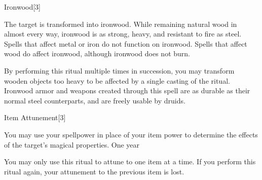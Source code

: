 \begin{spellsection}{Ironwood}[3]
    \begin{spellheader}
    \end{spellheader}
    \begin{spellcontent}
        \begin{spelltargetinginfo}
        \end{spelltargetinginfo}
        \begin{spelleffects}

            \spelleffect The target is transformed into ironwood. While remaining natural wood in almost every way, ironwood is as strong, heavy, and resistant to fire as steel. Spells that affect metal or iron do not function on ironwood. Spells that affect wood do affect ironwood, although ironwood does not burn.
        \end{spelleffects}
    \end{spellcontent}
    \begin{spellfooter}
        \spellnotes By performing this ritual multiple times in succession, you may transform wooden objects too heavy to be affected by a single casting of the ritual. Ironwood armor and weapons created through this spell are as durable as their normal steel counterparts, and are freely usable by druids.
    \end{spellfooter}
\end{spellsection}

\begin{spellsection}{Item Attunement}[3]
    \begin{spellheader}
    \end{spellheader}
    \begin{spellcontent}
        \begin{spelltargetinginfo}
        \end{spelltargetinginfo}
        \begin{spelleffects}
            \spelleffect You may use your spellpower in place of your item power to determine the effects of the target's magical properties.
            \spelldur One year
        \end{spelleffects}
    \end{spellcontent}
    \begin{spellfooter}
        \spellnotes You may only use this ritual to attune to one item at a time. If you perform this ritual again, your attunement to the previous item is lost.
    \end{spellfooter}
\end{spellsection}

